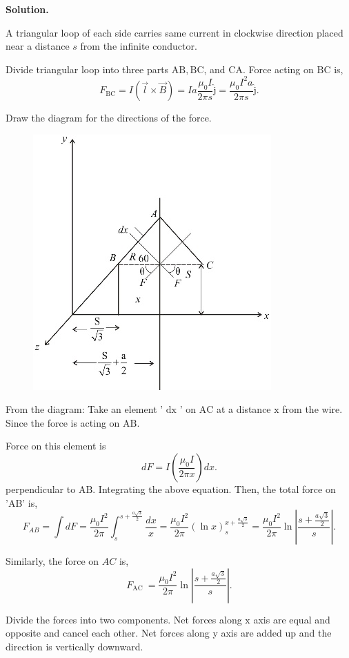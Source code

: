 \documentclass[12pt, a4paper, oneside]{report}
\newenvironment{solution}{
  \par\medskip\noindent
  \textbf{Solution.}\quad\itshape
  \par\noindent\makebox[\linewidth]{\rule{\textwidth}{0.4pt}}
}{
  \par\noindent\makebox[\linewidth]{\rule{\textwidth}{0.4pt}}
  \par\medskip
}
\begin{document}
\begin{solution}
A triangular loop of each side carries same current in clockwise direction placed near a distance $s$ from the infinite conductor.

Divide triangular loop into three parts $\mathrm{AB}, \mathrm{BC}$, and $\mathrm{CA}$.
Force acting on $\mathrm{BC}$ is,
$$
F_{\mathrm{BC}}  =I(\vec{l} \times \vec{B}) =I a \frac{\mu_0 I}{2 \pi s} \hat{\mathrm{j}} =\frac{\mu_0 I^2 a}{2 \pi s} \hat{\mathrm{j}}.
$$

Draw the diagram for the directions of the force.

\begin{figure}[ht!]
    \centering
    \includegraphics[width=0.6\linewidth]{9.png}
    \caption{}
    \label{fig:enter-label}
\end{figure}

From the diagram:
Take an element ' $\mathrm{dx}$ ' on $\mathrm{AC}$ at a distance $\mathrm{x}$ from the wire. Since the force is acting on $\mathrm{AB}$.

Force on this element is
$$
d F=I\left(\frac{\mu_0 I}{2 \pi x}\right) d x.
$$
perpendicular to $\mathrm{AB}$.
Integrating the above equation. Then, the total force on 'AB' is,
$$
F_{A B}  =\int d F  =\frac{\mu_0 I^2}{2 \pi} \int_s^{s+\frac{a \sqrt{3}}{2}} \frac{d x}{x}  =\frac{\mu_0 I^2}{2 \pi}(\ln x)_s^{x+\frac{a \sqrt{3}}{2}}  =\frac{\mu_0 I^2}{2 \pi} \ln \left|\frac{s+\frac{a \sqrt{3}}{2}}{s}\right|.
$$

Similarly, the force on $A C$ is,
$$
F_{\text {AC }}=\frac{\mu_0 I^2}{2 \pi} \ln \left|\frac{s+\frac{a \sqrt{3}}{2}}{s}\right|.
$$

Divide the forces into two components. Net forces along $\mathrm{x}$ axis are equal and opposite and cancel each other. Net forces along y axis are added up and the direction is vertically downward.


\end{solution}
\end{document}
